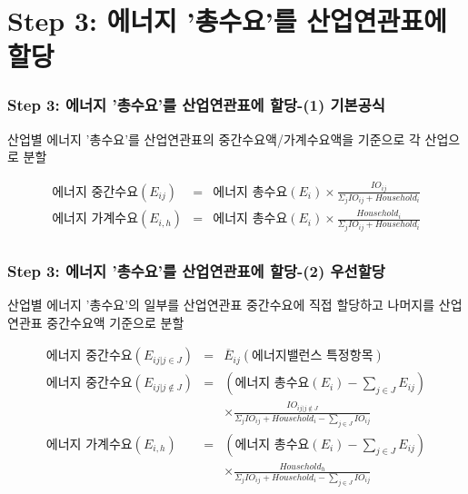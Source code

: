 \documentclass[10pt,compress,slidetop,%
			   hyperref={unicode},xcolor={svgnames},%
			   t]{beamer}
\begin{document}
\section{Step 3: 에너지 '총수요'를 산업연관표에 할당 }

\begin{frame}
	\frametitle{Step 3: 에너지 '총수요'를 산업연관표에 할당-(1) 기본공식}
\bigskip
산업별 에너지 '총수요'를 산업연관표의 중간수요액/가계수요액을 기준으로 각 산업으로 분할
\smallskip
\begin{small}
\begin{eqnarray*}
			\mbox{에너지 중간수요} (E_{ij})&=&\mbox{에너지 총수요}(E_i)\times\frac{IO_{ij}}{\Sigma_j IO_{ij}+Household_i}\\
			\mbox{에너지 가계수요} (E_{i,h})&=&\mbox{에너지 총수요}(E_i)\times\frac{Household_i}{\Sigma_j IO_{ij}+Household_i}\\
\end{eqnarray*}
\end{small}
		
\end{frame}

\begin{frame}
	\frametitle{Step 3: 에너지 '총수요'를 산업연관표에 할당-(2) 우선할당 }
\bigskip
산업별 에너지 '총수요'의 일부를 산업연관표 중간수요에 직접 할당하고 나머지를 산업연관표 중간수요액 기준으로 분할
\smallskip

\begin{small}
\begin{eqnarray*}
\mbox{에너지 중간수요} (E_{ij|j\in J})&=&\overline{E}_{ij}(\mbox{에너지밸런스 특정항목})\\
\mbox{에너지 중간수요} (E_{ij|j \notin J})&=&(\mbox{에너지 총수요}(E_i)-\sum_{j\in J}E_{ij})\\
& &\times\frac{IO_{ij| j \notin J}}{\Sigma_{j}IO_{ij}+Household_i-\sum_{j\in J}IO_{ij}}\\
\mbox{에너지 가계수요} (E_{i,h})&=&(\mbox{에너지 총수요}(E_i)-\sum_{j\in J}E_{ij})\\
& &\times\frac{Household_h}{\Sigma_{j}IO_{ij}+Household_i-\sum_{j\in J}IO_{ij}}
\end{eqnarray*}
\end{small}


\end{frame}
\end{document}
